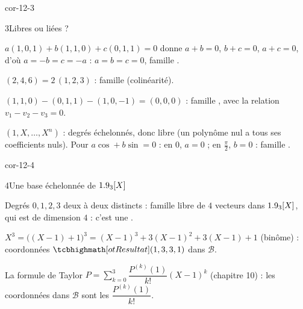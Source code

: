 \begin{blocLivre}{cor-12-3}
\begin{corrige}{3}{Libres ou liées ?}
\begin{questions}
  \item $a(1,0,1)+b(1,1,0)+c(0,1,1)=0$ donne $a+b=0$, $b+c=0$, $a+c=0$,
    d'où $a=-b=c=-a$ : $a=b=c=0$, famille .
  \item $(2,4,6)=2\,(1,2,3)$ : famille  (colinéarité).
  \item $(1,1,0)-(0,1,1)-(1,0,-1)=(0,0,0)$ : famille ,
    avec la relation $v_1-v_2-v_3=0$.
  \item $(1,X,\dots,X^{n})$ : degrés échelonnés, donc libre (un polynôme
    nul a tous ses coefficients nuls). Pour $a\cos+b\sin=0$ : en $0$,
    $a=0$ ; en $\frac{\pi}{2}$, $b=0$ : famille .
\end{questions}
\end{corrige}
\end{blocLivre}

\begin{blocLivre}{cor-12-4}
\begin{corrige}{4}{Une base échelonnée de $1.9_3[X]$}
\begin{questions}
  \item Degrés $0,1,2,3$ deux à deux distincts : famille libre de $4$
    vecteurs dans $1.9_3[X]$, qui est de dimension $4$ : c'est une
    .
  \item $X^{3}=\bigl((X-1)+1\bigr)^{3}
    =(X-1)^{3}+3(X-1)^{2}+3(X-1)+1$ (binôme) : coordonnées
    $\res{(1,3,3,1)}$ dans $\mathcal{B}$.
  \item La formule de Taylor $P=\sum_{k=0}^{3}\dfrac{P^{(k)}(1)}{k!}(X-1)^{k}$
    (chapitre 10) : les coordonnées dans $\mathcal{B}$ sont les
    $\dfrac{P^{(k)}(1)}{k!}$.
\end{questions}
\end{corrige}
\end{blocLivre}


